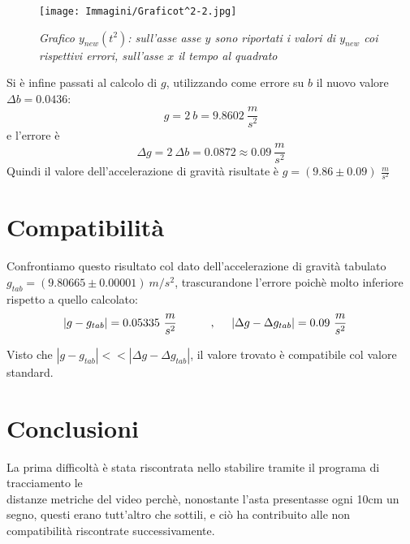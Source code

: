 \documentclass[12pt, a4paper]{article}
\begin{document}
\addvspace{1.5cm}
  \begin{figure}[h!]
\centering
\texttt{[image: Immagini/Graficot^2-2.jpg]}
\caption{\textit{{\footnotesize{Grafico $y_{new}(t^2)$: sull'asse asse $y$ sono riportati i valori di $y_{new}$ coi rispettivi errori, sull'asse $x$ il tempo al quadrato}}}}
\label{Grafico compatibile y(t^2)}
\end{figure}





Si è infine passati al calcolo di $g$, utilizzando come errore su $b$ il nuovo valore $\Delta b=0.0436$:
\begin{equation*}
    g=2 \ b=9.8602\ \frac{m}{s^2}
\end{equation*}
e l'errore è
\begin{equation*}
    \Delta g=2\ \Delta b=0.0872\approx 0.09\ \frac{m}{s^2}
\end{equation*}
Quindi il valore dell'accelerazione di gravità risultate è $g=(9.86\pm0.09)$ $\frac{m}{s^2}$
\section{Compatibilità}
Confrontiamo questo risultato col dato dell'accelerazione di gravità tabulato $g_{tab}=(9.80665\pm 0.00001)\ m/s^2$, trascurandone l'errore poichè molto inferiore rispetto a quello calcolato:
\begin{equation*}
\begin{aligned}
  & |g-g_{tab}|=0.05335 \ \frac{m}{s^2}
  &\quad{} 
  \end{aligned}
  \begin{aligned}
  &&\text{,\phantom{..}}& & 
  |\Delta g-\Delta g_{tab}|=0.09\ \frac{m}{s^2}
  &
  \end{aligned}
\end{equation*}

Visto che $|g-g_{tab}|<< |\Delta g-\Delta g_{tab}|$, il valore trovato è compatibile col valore standard.

\newpage
\section{Conclusioni}
La prima difficoltà è stata riscontrata nello stabilire tramite il programa di tracciamento le \\
distanze metriche del video perchè, nonostante l'asta presentasse ogni 10cm un segno, questi erano tutt'altro che sottili, e ciò ha contribuito alle non compatibilità riscontrate successivamente. 
\end{document}

